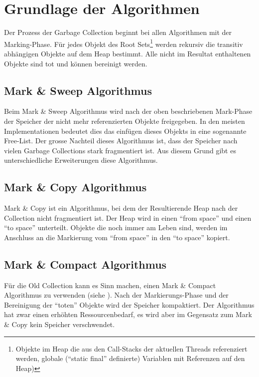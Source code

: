 \section{Grundlage der Algorithmen}
Der Prozess der Garbage Collection beginnt bei allen Algorithmen mit der Marking-Phase. Für jedes Objekt des Root Sets\footnote{Objekte im Heap die aus den Call-Stacks der aktuellen Threads referenziert werden, globale (``static final'' definierte) Variablen mit Referenzen auf den Heap)} werden rekursiv die transitiv abhängigen Objekte auf dem Heap bestimmt. Alle nicht im Resultat enthaltenen Objekte sind tot und können bereinigt werden.

\subsection{Mark \& Sweep Algorithmus}
Beim Mark \& Sweep Algorithmus wird nach der oben beschriebenen Mark-Phase der Speicher der nicht mehr referenzierten Objekte freigegeben. In den meisten Implementationen bedeutet dies das einfügen dieses Objekts in eine sogenannte Free-List. Der grosse Nachteil dieses Algorithmus ist, dass der Speicher nach vielen Garbage Collections stark fragmentiert ist. Aus diesem Grund gibt es unterschiedliche Erweiterungen diese Algorithmus.

\subsection{Mark \& Copy Algorithmus}
Mark \& Copy ist ein Algorithmus, bei dem der Resultierende Heap nach der Collection nicht fragmentiert ist. Der Heap wird in einen ``from space'' und einen ``to space'' unterteilt. Objekte die noch immer am Leben sind, werden im Anschluss an die Markierung vom ``from space'' in den ``to space'' kopiert.

\subsection{Mark \& Compact Algorithmus}
Für die Old Collection kann es Sinn machen, einen Mark \& Compact Algorithmus zu verwenden (siehe ). Nach der Markierungs-Phase und der Bereinigung der ``toten'' Objekte wird der Speicher kompaktiert. Der Algorithmus hat zwar einen erhöhten Ressourcenbedarf, es wird aber im Gegensatz zum Mark \& Copy kein Speicher verschwendet. 


